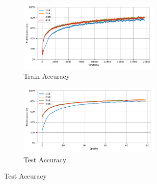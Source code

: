     \label{appendix:accuracy_curves_cifar10}
        \begin{figure}[H]
            \centering
            \begin{subfigure}[H]{0.55\textwidth}
                \centering
                \begin{subfigure}[H]{\textwidth}
                    \centering
                    \includegraphics[width=\textwidth]{../standard/CIFAR10/plots/cifar10_train_acc.pdf}
                    \caption{Train Accuracy}
                \end{subfigure}
                \hfill
                \begin{subfigure}[H]{\textwidth}
                    \centering
                    \includegraphics[width=\textwidth]{../standard/CIFAR10/plots/cifar10_test_acc.pdf}
                    \caption{Test Accuracy}
                \end{subfigure}
            \end{subfigure}
            \hfill
            \begin{subfigure}[H]{0.3\textwidth}
                \centering

\end{subfigure}
\end{figure}
